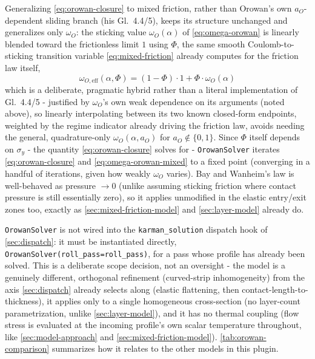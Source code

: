 \documentclass[11pt]{PyRollDocs}
\begin{document}
    Generalizing \autoref{eq:orowan-closure} to mixed friction, rather than Orowan's own $a_O$-dependent sliding branch (his Gl.~4.4/5), keeps its structure unchanged and generalizes only $\omega_O$: the sticking value $\omega_O(\alpha)$ of \autoref{eq:omega-orowan} is linearly blended toward the frictionless limit $1$ using $\Phi$, the same smooth Coulomb-to-sticking transition variable \autoref{eq:mixed-friction} already computes for the friction law itself,
    \begin{equation}
        \omega_{O,\mathrm{eff}}(\alpha, \Phi) = (1-\Phi)\cdot 1 + \Phi\cdot\omega_O(\alpha)
        \label{eq:omega-orowan-mixed}
    \end{equation}
    which is a deliberate, pragmatic hybrid rather than a literal implementation of Gl.~4.4/5 - justified by $\omega_O$'s own weak dependence on its arguments (noted above), so linearly interpolating between its two known closed-form endpoints, weighted by the regime indicator already driving the friction law, avoids needing the general, quadrature-only $\omega_O(\alpha, a_O)$ for $a_O \notin \{0,1\}$. Since $\Phi$ itself depends on $\sigma_y$ - the quantity \autoref{eq:orowan-closure} solves for - \lstinline{OrowanSolver} iterates \autoref{eq:orowan-closure} and \autoref{eq:omega-orowan-mixed} to a fixed point (converging in a handful of iterations, given how weakly $\omega_O$ varies). Bay and Wanheim's law is well-behaved as pressure $\to 0$ (unlike assuming sticking friction where contact pressure is still essentially zero), so it applies unmodified in the elastic entry/exit zones too, exactly as \autoref{sec:mixed-friction-model} and \autoref{sec:layer-model} already do.

    \lstinline{OrowanSolver} is not wired into the \lstinline{karman_solution} dispatch hook of \autoref{sec:dispatch}: it must be instantiated directly, \lstinline{OrowanSolver(roll_pass=roll_pass)}, for a pass whose profile has already been solved. This is a deliberate scope decision, not an oversight - the model is a genuinely different, orthogonal refinement (curved-strip inhomogeneity) from the axis \autoref{sec:dispatch} already selects along (elastic flattening, then contact-length-to-thickness), it applies only to a single homogeneous cross-section (no layer-count parametrization, unlike \autoref{sec:layer-model}), and it has no thermal coupling (flow stress is evaluated at the incoming profile's own scalar temperature throughout, like \autoref{sec:model-approach} and \autoref{sec:mixed-friction-model}). \autoref{tab:orowan-comparison} summarizes how it relates to the other models in this plugin.
\end{document}
